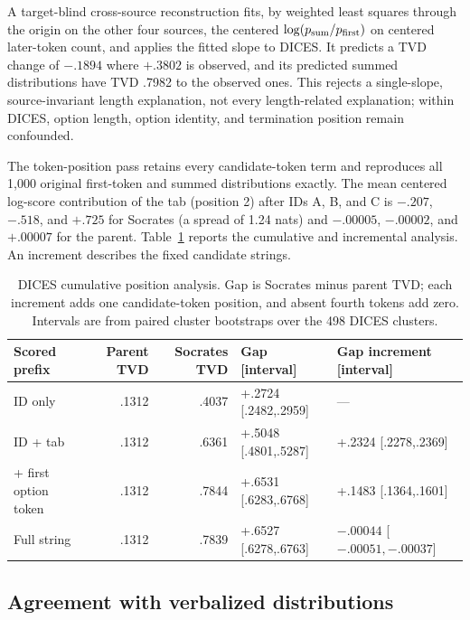 \documentclass[11pt]{article}
\begin{document}
A target-blind cross-source reconstruction fits, by weighted least squares
through the origin on the other four sources, the centered
$\log(p_{\rm sum}/p_{\rm first})$ on centered later-token count, and applies
the fitted slope to DICES. It predicts a TVD change of $-.1894$ where $+.3802$
is observed, and its predicted summed distributions have TVD .7982 to the
observed ones. This rejects a single-slope, source-invariant length
explanation, not every length-related explanation; within DICES, option
length, option identity, and termination position remain confounded.

The token-position pass retains every candidate-token term and reproduces all
1,000 original first-token and summed distributions exactly. The mean centered
log-score contribution of the tab (position 2) after IDs A, B, and C is
$-.207$, $-.518$, and $+.725$ for Socrates (a spread of 1.24 nats) and
$-.00005$, $-.00002$, and $+.00007$ for the parent.
Table~\ref{tab:qwen14-dices-token-decomposition} reports the cumulative and
incremental analysis. An increment describes the fixed candidate strings.

\begin{table}[t]
\centering\small
\setlength{\tabcolsep}{4pt}
\begin{tabular}{@{}lrrll@{}}
\toprule
Scored prefix & Parent TVD & Socrates TVD & Gap [interval] & Gap increment [interval] \\
\midrule
ID only & .1312 & .4037 & +.2724 [.2482,.2959] & --- \\
ID + tab & .1312 & .6361 & +.5048 [.4801,.5287] & +.2324 [.2278,.2369] \\
+ first option token & .1312 & .7844 & +.6531 [.6283,.6768] & +.1483 [.1364,.1601] \\
Full string & .1312 & .7839 & +.6527 [.6278,.6763] & $-.00044$ [$-.00051,-.00037$] \\
\bottomrule
\end{tabular}
\caption{DICES cumulative position analysis. Gap is Socrates minus parent TVD;
each increment adds one candidate-token position, and absent fourth tokens add
zero. Intervals are from paired cluster bootstraps over the 498 DICES
clusters.}
\label{tab:qwen14-dices-token-decomposition}
\end{table}

\subsection{Agreement with verbalized distributions}
\end{document}
